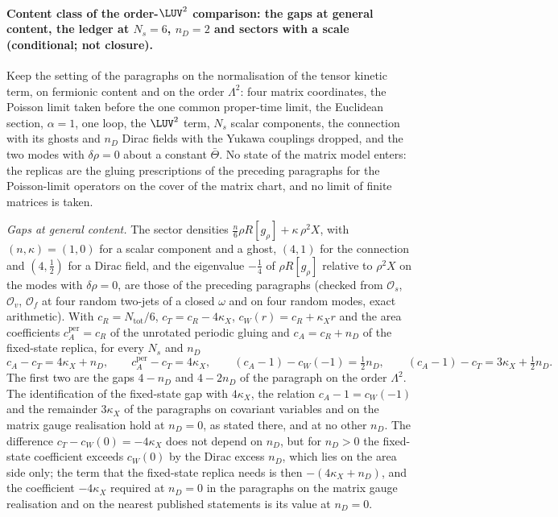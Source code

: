 \paragraph{Content class of the order-\(\LUV^2\) comparison: the gaps at general content, the ledger at \(N_s=6\), \(n_D=2\) and sectors with a scale (conditional; not closure).}
Keep the setting of the paragraphs on the normalisation of the tensor kinetic term, on fermionic content and on the order \(\Lambda^2\): four matrix coordinates, the Poisson limit taken before the one common proper-time limit, the Euclidean section, \(\alpha=1\), one loop, the \(\LUV^2\) term, \(N_s\) scalar components, the connection with its ghosts and \(n_D\) Dirac fields with the Yukawa couplings dropped, and the two modes with \(\delta\rho=0\) about a constant \(\bar\Theta\). No state of the matrix model enters: the replicas are the gluing prescriptions of the preceding paragraphs for the Poisson-limit operators on the cover of the matrix chart, and no limit of finite matrices is taken.

\emph{Gaps at general content.} The sector densities \(\tfrac n6\rho R[g_\rho]+\kappa\,\rho^2X\), with \((n,\kappa)=(1,0)\) for a scalar component and a ghost, \((4,1)\) for the connection and \((4,\tfrac12)\) for a Dirac field, and the eigenvalue \(-\tfrac14\) of \(\rho R[g_\rho]\) relative to \(\rho^2X\) on the modes with \(\delta\rho=0\), are those of the preceding paragraphs (checked from \(\mathcal O_s\), \(\mathcal O_v\), \(\mathcal O_f\) at four random two-jets of a closed \(\omega\) and on four random modes, exact arithmetic). With \(c_R=N_{\mathrm{tot}}/6\), \(c_T=c_R-4\kappa_X\), \(c_W(r)=c_R+\kappa_Xr\) and the area coefficients \(c_A^{\mathrm{per}}=c_R\) of the unrotated periodic gluing and \(c_A=c_R+n_D\) of the fixed-state replica, for every \(N_s\) and \(n_D\)
\[
  c_A-c_T=4\kappa_X+n_D,\qquad c_A^{\mathrm{per}}-c_T=4\kappa_X,\qquad (c_A-1)-c_W(-1)=\tfrac12n_D,\qquad (c_A-1)-c_T=3\kappa_X+\tfrac12n_D .
\]
The first two are the gaps \(4-n_D\) and \(4-2n_D\) of the paragraph on the order \(\Lambda^2\). The identification of the fixed-state gap with \(4\kappa_X\), the relation \(c_A-1=c_W(-1)\) and the remainder \(3\kappa_X\) of the paragraphs on covariant variables and on the matrix gauge realisation hold at \(n_D=0\), as stated there, and at no other \(n_D\). The difference \(c_T-c_W(0)=-4\kappa_X\) does not depend on \(n_D\), but for \(n_D>0\) the fixed-state coefficient exceeds \(c_W(0)\) by the Dirac excess \(n_D\), which lies on the area side only; the term that the fixed-state replica needs is then \(-(4\kappa_X+n_D)\), and the coefficient \(-4\kappa_X\) required at \(n_D=0\) in the paragraphs on the matrix gauge realisation and on the nearest published statements is its value at \(n_D=0\).

